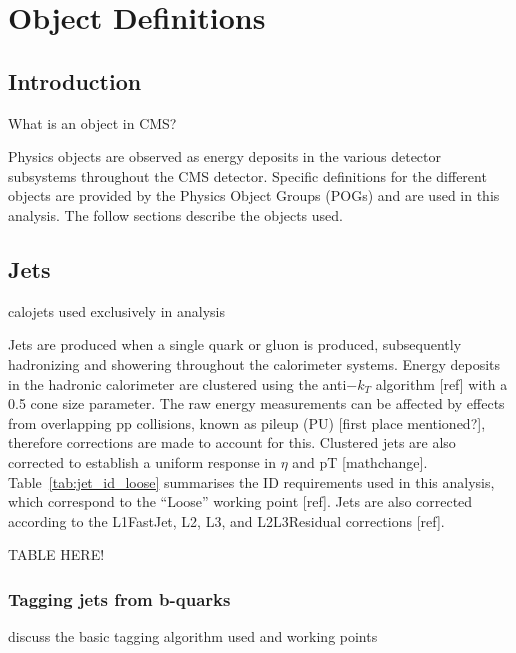 \chapter{Object Definitions}

\ifpdf
    \graphicspath{{Chapter4/Figs/Raster/}{Chapter4/Figs/PDF/}{Chapter4/Figs/}}
\else
    \graphicspath{{Chapter4/Figs/Vector/}{Chapter4/Figs/}}
\fi


\section{Introduction}  %
\label{sec:objects_introduction}
What is an object in CMS?

Physics objects are observed as energy deposits in the various detector 
subsystems throughout the CMS detector. Specific definitions for the different 
objects are provided by the Physics Object Groups (POGs) and are used in this 
analysis. The follow sections describe the objects used.


\section{Jets}  %
\label{sec:objects_jets}
calojets used exclusively in analysis

Jets are produced when a single quark or gluon is produced, subsequently 
hadronizing and showering throughout the calorimeter systems. Energy deposits in
the hadronic calorimeter are clustered using the anti$-k_T$ algorithm [ref] with
a 0.5 cone size parameter. The raw energy measurements can be affected by 
effects from overlapping pp collisions, known as pileup (PU) [first place 
mentioned?], therefore corrections are made to account for this. Clustered jets 
are also corrected to establish a uniform response in $\eta$ and pT [mathchange].
Table~\ref{tab:jet_id_loose} summarises the ID requirements used in this 
analysis, which correspond to the ``Loose'' working point [ref]. Jets are also 
corrected according to the L1FastJet, L2, L3, and L2L3Residual corrections [ref].


TABLE HERE!

\subsection{Tagging jets from b-quarks}
discuss the basic tagging algorithm used and working points

